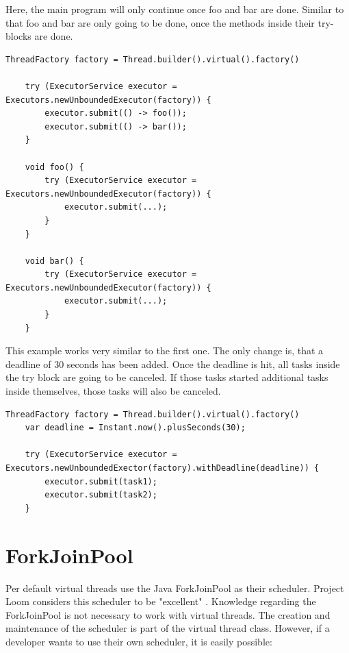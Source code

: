 Here, the main program will only continue once foo and bar are done. Similar to that foo and bar are only going to be done, once the methods inside their try-blocks are done.
\begin{lstlisting}[language=custom-java,caption={Structured Concurrency - Nested \cite{loom:structured-concurrency}},captionpos=b]
    ThreadFactory factory = Thread.builder().virtual().factory()

    try (ExecutorService executor = Executors.newUnboundedExecutor(factory)) {
        executor.submit(() -> foo());
        executor.submit(() -> bar());
    }

    void foo() {
        try (ExecutorService executor = Executors.newUnboundedExecutor(factory)) {
            executor.submit(...);
        }
    }

    void bar() {
        try (ExecutorService executor = Executors.newUnboundedExecutor(factory)) {
            executor.submit(...);
        }
    }
\end{lstlisting}

This example works very similar to the first one. The only change is, that a deadline of 30 seconds has been added. Once the deadline is hit, all tasks inside the try block are going to be canceled. If those tasks started additional tasks inside themselves, those tasks will also be canceled.

\begin{lstlisting}[language=custom-java,caption={Structured Concurrency - Deadlines \cite{loom:structured-concurrency}},captionpos=b]
    ThreadFactory factory = Thread.builder().virtual().factory()
    var deadline = Instant.now().plusSeconds(30);

    try (ExecutorService executor = Executors.newUnboundedExector(factory).withDeadline(deadline)) {
        executor.submit(task1);
        executor.submit(task2);
    }
\end{lstlisting}


\section{ForkJoinPool}
Per default virtual threads use the Java ForkJoinPool as their scheduler. Project Loom considers this scheduler to be "excellent" \cite{loom:proposal}. Knowledge regarding the ForkJoinPool is not necessary to work with virtual threads. The creation and maintenance of the scheduler is part of the virtual thread class. However, if a developer wants to use their own scheduler, it is easily possible:

